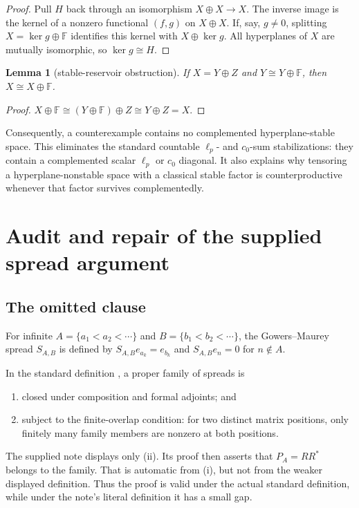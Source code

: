 \documentclass[11pt]{article}
\newtheorem{lemma}[theorem]{Lemma}
\theoremstyle{definition}
\theoremstyle{remark}
\newcommand{\F}{\mathbb F}
\begin{document}
\begin{proof}
Pull $H$ back through an isomorphism $X\oplus X\to X$.  The inverse image is
the kernel of a nonzero functional $(f,g)$ on $X\oplus X$.  If, say, $g\ne0$,
splitting $X=\ker g\oplus\F$ identifies this kernel with $X\oplus\ker g$.
All hyperplanes of $X$ are mutually isomorphic, so $\ker g\cong H$.
\end{proof}

\begin{lemma}[stable-reservoir obstruction]\label{lem:reservoir}
If $X=Y\oplus Z$ and $Y\cong Y\oplus\F$, then $X\cong X\oplus\F$.
\end{lemma}

\begin{proof}
$X\oplus\F\cong(Y\oplus\F)\oplus Z\cong Y\oplus Z=X$.
\end{proof}

Consequently, a counterexample contains no complemented hyperplane-stable
space.  This eliminates the standard countable $\ell_p$- and $c_0$-sum
stabilizations: they contain a complemented scalar $\ell_p$ or $c_0$ diagonal.
It also explains why tensoring a hyperplane-nonstable space with a classical
stable factor is counterproductive whenever that factor survives complementedly.

\section{Audit and repair of the supplied spread argument}

\subsection{The omitted clause}

For infinite $A=\{a_1<a_2<\cdots\}$ and
$B=\{b_1<b_2<\cdots\}$, the Gowers--Maurey spread $S_{A,B}$ is defined by
$S_{A,B}e_{a_k}=e_{b_k}$ and $S_{A,B}e_n=0$ for $n\notin A$.

In the standard definition \cite[Section 3]{GowersMaurey1997}, a proper family
of spreads is
\begin{enumerate}[label=\textup{(\roman*)}]
\item closed under composition and formal adjoints; and
\item subject to the finite-overlap condition: for two distinct matrix
positions, only finitely many family members are nonzero at both positions.
\end{enumerate}
The supplied note displays only (ii).  Its proof then asserts that
$P_A=R R^*$ belongs to the family.  That is automatic from (i), but not from the
weaker displayed definition.  Thus the proof is valid under the actual standard
definition, while under the note's literal definition it has a small gap.
\end{document}
